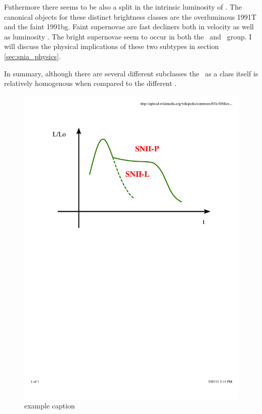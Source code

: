 Futhermore there seems to be also a split in the intrinsic luminosity of \sneia. The canonical objects for these distinct brightness classes are the overluminous 1991T \citet{1992AJ....103.1632P} and the faint 1991bg.
Faint supernovae are fast decliners both in velocity as well as luminosity \citet{2005ApJ...623.1011B}. The bright supernovae seem to occur in both the \hvg\ and \lvg\ group. I will discuss the physical implications of these two subtypes in section \ref{sec:snia_physics}.

In summary, although there are several different subclasses the \snia\ as a class itself is relatively homogenous when compared to the different \sneii.

\begin{figure}[htbp] %
   \centering
   \includegraphics[width=\textwidth]{chapter_intro/plots/snii_lc_comparison.pdf} 
   \caption{example caption}
   \label{fig:snii_lc_comparison}
\end{figure}


